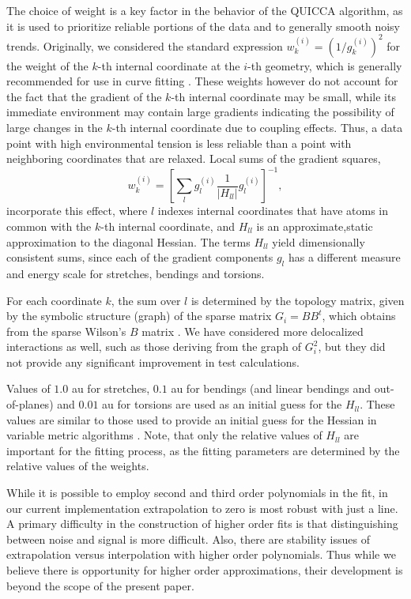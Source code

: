 \documentclass[prl,aps,preprint,showpacs,superbib]{revtex4}
\begin{document}
The choice of weight is a key factor in the behavior of the QUICCA algorithm, as it is used to prioritize 
reliable portions of the data and to generally smooth noisy trends.  
Originally, we considered the standard expression $w_{k}^{(i)}=\left(1/{g_{k}^{(i)}}\right)^2$ for the weight 
of the $k$-th internal coordinate at the $i$-th geometry, which is generally recommended for use in curve 
fitting \cite{numerical_recipies}.  These weights however do not 
account for the fact that the gradient of the $k$-th internal coordinate may be small, while 
its immediate  environment may contain large gradients indicating the possibility of large changes in the $k$-th 
internal coordinate due to coupling effects.  Thus, a data point with high environmental tension 
is less reliable than a point with neighboring coordinates that are relaxed.   
Local sums of the gradient squares,
\begin{equation}
\label{weights}
w_{k}^{(i)} = \left[ \sum_{l} g_{l}^{(i)} \frac{1}{|H_{ll}^{}|} g_{l}^{(i)} \right]^{-1} ,
\end{equation}
incorporate this effect, where  $l$ indexes internal coordinates that have atoms in common with 
the $k$-th internal coordinate, and $H_{ll}^{}$ is an approximate,static approximation to the 
diagonal Hessian.  The terms $H_{ll}$ yield dimensionally consistent sums, since each of the gradient 
components  $g_{l}$ has a different measure and energy scale for stretches, bendings and torsions.  

For each coordinate $k$, the sum over $l$ is determined by the topology matrix, given by the symbolic 
structure (graph) of the sparse matrix $G_{i}=BB^{t}$, which obtains from the sparse Wilson's $B$ 
matrix \cite{wilson}.  We have considered more delocalized interactions as well, such as those deriving 
from the graph of $G_i^2$, but they did not provide any significant improvement in test calculations.

Values of $1.0$ au for stretches, $0.1$ au for bendings (and linear bendings and out-of-planes) and $0.01$ au
for torsions are used as an initial guess for the $H_{ll}$.  These values are similar to those used to provide 
an initial guess for the Hessian in variable metric algorithms \cite{bakken}.  Note, that only the relative 
values of $H_{ll}$ are important for the fitting process, as the fitting parameters are determined by the 
relative values of the weights.  

While it is possible to employ second and third order polynomials in the fit, in our 
current implementation extrapolation to zero is most robust with just a line.  
A primary difficulty in the construction of higher order fits is that distinguishing 
between noise and signal is more difficult.  Also, there are stability 
issues of extrapolation versus interpolation with higher order polynomials.
Thus while we believe there is opportunity for higher order approximations,  
their development is beyond the scope of the present paper.  
\end{document}

